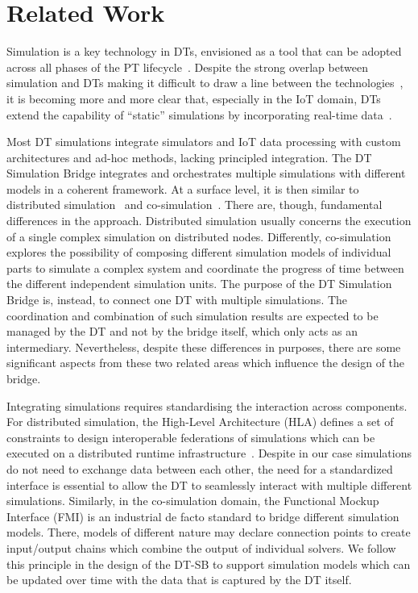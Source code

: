 \section{Related Work}
\label{sec:relatedwork}

Simulation is a key technology in DTs, envisioned as a tool that can be adopted across all phases of the PT lifecycle~\cite{Boschert2016}.
%
Despite the strong overlap between simulation and DTs making it difficult to draw a line between the technologies~\cite{WOOLEY2023940}, it is becoming more and more clear that, especially in the IoT domain, DTs extend the capability of ``static'' simulations by incorporating real-time data~\cite{PHANDEN2021174}.

Most DT simulations integrate simulators and IoT data processing with custom architectures and ad-hoc methods, lacking principled integration. The DT Simulation Bridge integrates and orchestrates multiple simulations with different models in a coherent framework.
%
At a surface level, it is then similar to distributed simulation~\cite{2000daglib} and co-simulation~\cite{Gomes&18}. 
%
There are, though, fundamental differences in the approach.
%
Distributed simulation usually concerns the execution of a single complex simulation on distributed nodes.
%
Differently, co-simulation explores the possibility of composing different simulation models of individual parts to simulate a complex system and coordinate the progress of time between the different independent simulation units.
%
The purpose of the DT Simulation Bridge is, instead, to connect one DT with multiple simulations.
%
The coordination and combination of such simulation results are expected to be managed by the DT and not by the bridge itself, which only acts as an intermediary.
%
Nevertheless, despite these differences in purposes, there are some significant aspects from these two related areas which influence the design of the bridge. 

Integrating simulations requires standardising the interaction across components.
%
For distributed simulation, the High-Level Architecture (HLA) defines a set of constraints to design interoperable federations of simulations which can be executed on a distributed runtime infrastructure~\cite{568652}.
%
Despite in our case simulations do not need to exchange data between each other, the need for a standardized interface is essential to allow the DT to seamlessly interact with multiple different simulations.
%
Similarly, in the co-simulation domain, the Functional Mockup Interface (FMI) is an industrial de facto standard \cite{FMIStandard2.0} to bridge different simulation models.
%
There, models of different nature may declare connection points to create input/output chains which combine the output of individual solvers.
%
We follow this principle in the design of the DT-SB to support simulation models which can be updated over time with the data that is captured by the DT itself. 